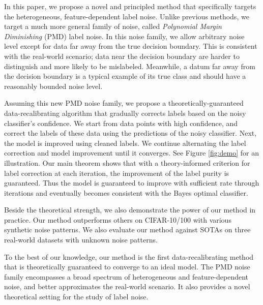 \documentclass{article} \usepackage{iclr2021_conference,times}
\begin{document}
In this paper, we propose a novel and principled method that specifically targets the heterogeneous, feature-dependent label noise. Unlike previous methods, we target a much more general family of noise, called \emph{Polynomial Margin Diminishing} (PMD) label noise. 
In this noise family, we allow arbitrary noise level except for data far away from the true decision boundary.
This is consistent with the real-world scenario; data near the decision boundary are harder to distinguish and more likely to be mislabeled. Meanwhile, a datum far away from the decision boundary is a typical example of its true class and should have a reasonably bounded noise level.

Assuming this new PMD noise family, we propose a theoretically-guaranteed data-recalibrating algorithm that gradually corrects labels based on the noisy classifier's confidence. We start from data points with high confidence, and correct the labels of these data using the predictions of the noisy classifier. Next, the model is improved using cleaned labels. We continue alternating the label correction and model improvement until it converges.
See Figure \ref{fig:demo} for an illustration. 
Our main theorem shows that with a theory-informed criterion for label correction at each iteration, the improvement of the label purity is guaranteed. Thus the model is guaranteed to improve with sufficient rate through iterations and eventually becomes consistent with the Bayes optimal classifier. 

Beside the theoretical strength, we also demonstrate the power of our method in practice. Our method outperforms others on CIFAR-10/100 with various synthetic noise patterns. We also evaluate our method against SOTAs on three real-world datasets with unknown noise patterns.

To the best of our knowledge, our method is the first data-recalibrating method that is theoretically guaranteed to converge to an ideal model. The PMD noise family encompasses a broad spectrum of heterogeneous and feature-dependent noise, and better approximates the real-world scenario. It also provides a novel theoretical setting for the study of label noise.
\end{document}
